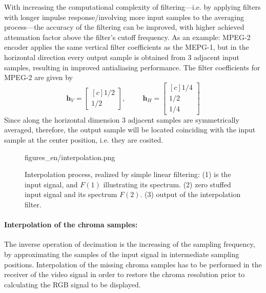 With increasing the computational complexity of filtering---i.e. by applying filters with longer impulse response/involving more input samples to the averaging process---the accuracy of the filtering can be improved, with higher achieved attenuation factor above the filter's cutoff frequency.
As an example: MPEG-2 encoder applies the same vertical filter coefficients as the MEPG-1, but in the horizontal direction every output sample is obtained from 3 adjacent input samples, resulting in improved antialiasing performance.
The filter coefficients for MPEG-2 are given by
\begin{equation}
\mathbf{h}_V =
\begin{bmatrix}[c]
       1/2 \\[0.3em]
       1/2\end{bmatrix}
,
\hspace{1cm}
\mathbf{h}_H =
\begin{bmatrix}[c]
       1/4 \\[0.3em]
       1/2 \\[0.3em]
       1/4\end{bmatrix}
\end{equation}
Since along the horizontal dimension 3 adjacent samples are symmetrically averaged, therefore, the output sample will be located coinciding with the input sample at the center position, i.e. they are cosited.
\begin{figure}[]
	\centering
	\begin{overpic}[width = 0.8\columnwidth]{figures_en/interpolation.png}
 	\end{overpic}
	\caption{Interpolation process, realized by simple linear filtering:
	(1) is the input signal, and $F(1)$ illustrating its spectrum.
	(2) zero stuffed input signal and its spectrum $F(2)$.
	(3) output of the interpolation filter.}
	\label{Fig:interpolation}
\end{figure}

\paragraph{Interpolation of the chroma samples:}
The inverse operation of decimation is the increasing of the sampling frequency, by approximating the samples of the input signal in intermediate sampling positions.
Interpolation of the missing chroma samples has to be performed in the receiver of the video signal in order to restore the chroma resolution prior to calculating the RGB signal to be displayed.

